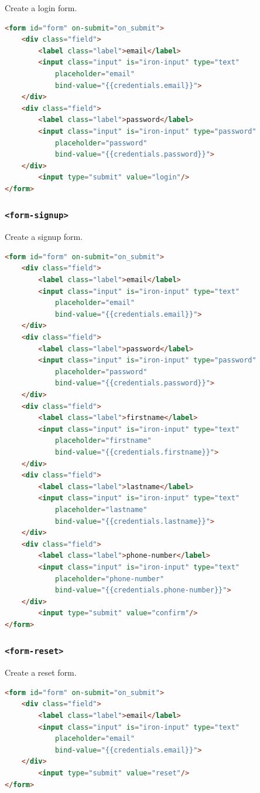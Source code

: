 Create a login form.
\begin{lstlisting}[language=html]
<form id="form" on-submit="on_submit">
    <div class="field">
        <label class="label">email</label>
        <input class="input" is="iron-input" type="text" 
    		placeholder="email" 
            bind-value="{{credentials.email}}">
    </div>
    <div class="field">
        <label class="label">password</label>
        <input class="input" is="iron-input" type="password" 
        	placeholder="password" 
        	bind-value="{{credentials.password}}">
    </div>
      	<input type="submit" value="login"/>
</form>
\end{lstlisting}

\subsubsection{\texttt{<form-signup>}}

Create a signup form.
\begin{lstlisting}[language=html]
<form id="form" on-submit="on_submit">
    <div class="field">
        <label class="label">email</label>
        <input class="input" is="iron-input" type="text" 
    		placeholder="email" 
            bind-value="{{credentials.email}}">
    </div>
    <div class="field">
        <label class="label">password</label>
        <input class="input" is="iron-input" type="password" 
        	placeholder="password" 
        	bind-value="{{credentials.password}}">
    </div>
    <div class="field">
        <label class="label">firstname</label>
        <input class="input" is="iron-input" type="text" 
        	placeholder="firstname" 
        	bind-value="{{credentials.firstname}}">
    </div>
    <div class="field">
        <label class="label">lastname</label>
        <input class="input" is="iron-input" type="text" 
        	placeholder="lastname" 
        	bind-value="{{credentials.lastname}}">
    </div>
    <div class="field">
        <label class="label">phone-number</label>
        <input class="input" is="iron-input" type="text" 
        	placeholder="phone-number" 
        	bind-value="{{credentials.phone-number}}">
    </div>
      	<input type="submit" value="confirm"/>
</form>
\end{lstlisting}


\subsubsection{\texttt{<form-reset>}}

Create a reset form.
\begin{lstlisting}[language=html]
<form id="form" on-submit="on_submit">
    <div class="field">
        <label class="label">email</label>
        <input class="input" is="iron-input" type="text" 
    		placeholder="email" 
            bind-value="{{credentials.email}}">
    </div>
      	<input type="submit" value="reset"/>
</form>
\end{lstlisting}


